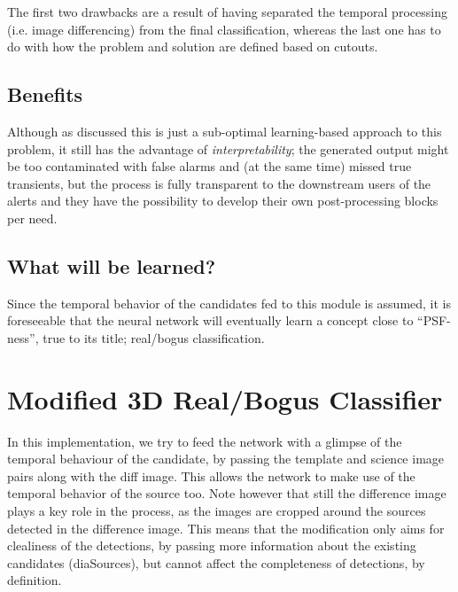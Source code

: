 The first two drawbacks are a result of having separated the temporal processing (i.e. image differencing) from the final classification, whereas the last one has to do with how the problem and solution are defined based on cutouts.



\subsection{Benefits}
\label{sec:rb_benefits}

Although as discussed this is just a sub-optimal learning-based approach to this problem, it still has the advantage of \emph{interpretability}; the generated output might be too contaminated with false alarms and (at the same time) missed true transients, but the process is fully transparent to the downstream users of the alerts and they have the possibility to develop their own post-processing blocks per need.


\subsection{What will be learned?}
Since the temporal behavior of the candidates fed to this module is assumed, it is foreseeable that the neural network will eventually learn a concept close to ``PSF-ness'', true to its title; real/bogus classification.

\section{Modified 3D Real/Bogus Classifier}
\label{sec:modified}
In this implementation, we try to feed the network with a glimpse of the temporal behaviour of the candidate, by passing the template and science image pairs along with the diff image. This allows the network to make use of the temporal behavior of the source too.
Note however that still the difference image plays a key role in the process, as the images are cropped around the sources detected in the difference image. This means that the modification only aims for clealiness of the detections, by passing more information about the existing candidates (diaSources), but cannot affect the completeness of detections, by definition.


